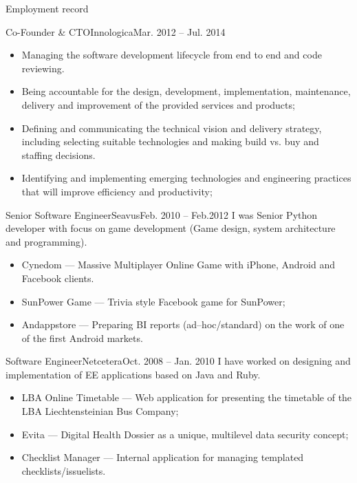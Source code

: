 \documentclass[]{mcdowellcv}
\begin{document}
\begin{cvsection}{Employment record}
\begin{cvsubsection}{Co-Founder \& CTO}{Innologica}{Mar. 2012 -- Jul. 2014}
\begin{itemize}
                \item Managing the software development lifecycle from end to end and code reviewing.
				\item Being accountable for the design, development, implementation, maintenance, delivery and improvement of the provided services and products;
				\item Defining and communicating the technical vision and delivery strategy, including selecting suitable technologies and making build vs. buy and staffing decisions.
				\item Identifying and implementing emerging technologies and engineering practices that will improve efficiency and productivity;
            \end{itemize}
        \end{cvsubsection}
        \begin{cvsubsection}{Senior Software Engineer}{Seavus}{Feb. 2010 -- Feb.2012}
            I was Senior Python developer with focus on game development (Game design, system architecture and programming).
            \begin{itemize}
                \item Cynedom --- Massive Multiplayer Online Game with iPhone, Android and Facebook clients.
                \item SunPower Game  --- Trivia style Facebook game for SunPower;
                \item Andappstore --- Preparing BI reports (ad--hoc/standard) on the work of one of the first Android markets.
            \end{itemize}
        \end{cvsubsection}
        \begin{cvsubsection}{Software Engineer}{Netcetera}{Oct. 2008 -- Jan. 2010}
            I have worked on designing and implementation of EE applications based on Java and Ruby.
            \begin{itemize}
                \item LBA Online Timetable --- Web application for presenting the timetable of the LBA Liechtensteinian Bus Company;
                \item Evita --- Digital Health Dossier as a unique, multilevel data security concept;
                \item Checklist Manager --- Internal application for managing templated checklists/issuelists.

\end{itemize}
\end{cvsubsection}
\end{cvsection}
\end{document}
